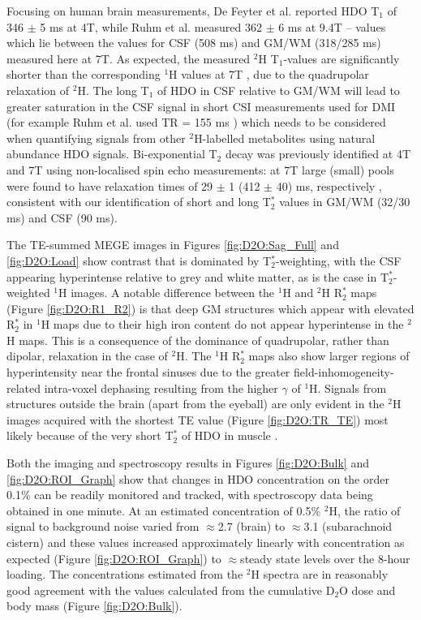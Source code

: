 \documentclass[class=article, crop=false]{standalone}
\begin{document}
Focusing on human brain measurements, De Feyter et al. \cite{DeFeyter2018DeuteriumVivo} reported HDO T$_1$ of 346 $\pm$ 5 ms at 4T, while Ruhm et al. \cite{Ruhm2021DeuteriumResolution} measured 362 $\pm$ 6 ms at 9.4T – values which lie between the values for CSF (508 ms) and GM/WM (318/285 ms) measured here at 7T. As expected, the measured $^2$H T$_1$-values are significantly shorter than the corresponding $^1$H values at 7T \cite{Peters2007T27T}, due to the quadrupolar relaxation of $^2$H. The long T$_1$ of HDO in CSF relative to GM/WM will lead to greater saturation in the CSF signal in short CSI measurements used for DMI (for example Ruhm et al. used TR = 155 ms \cite{Ruhm2021DeuteriumResolution}) which needs to be considered when quantifying signals from other $^2$H-labelled metabolites using natural abundance HDO signals. Bi-exponential T$_2$ decay was previously identified at 4T \cite{DeFeyter2018DeuteriumVivo} and 7T \cite{Roig2022Deuterium7T} using non-localised spin echo measurements: at 7T  large (small) pools were found to have relaxation times of 29 $\pm$ 1 (412 $\pm$ 40) ms, respectively \cite{Roig2022Deuterium7T}, consistent with our identification of short and long T$_2^*$ values in GM/WM (32/30 ms) and CSF (90 ms). 

The TE-summed MEGE images in Figures \ref{fig:D2O:Sag_Full} and \ref{fig:D2O:Load} show contrast that is dominated by T$_2^*$-weighting, with the CSF appearing hyperintense relative to grey and white matter, as is the case in T$_2^*$-weighted $^1$H images. A notable difference between the $^1$H and $^2$H R$_2^*$ maps (Figure \ref{fig:D2O:R1_R2}) is that deep GM structures which appear with elevated R$_2^*$ in $^1$H maps due to their high iron content \cite{Peters2007T27T} do not appear hyperintense in the $^2$H maps. This is a consequence of the dominance of quadrupolar, rather than dipolar, relaxation in the case of $^2$H. The $^1$H R$_2^*$ maps also show larger regions of hyperintensity near the frontal sinuses due to the greater field-inhomogeneity-related intra-voxel dephasing resulting from the higher $\gamma$ of $^1$H. Signals from structures outside the brain (apart from the eyeball) are only evident in the $^2$H images acquired with the shortest TE value (Figure \ref{fig:D2O:TR_TE}) most likely because of the very short T$_2^*$ of HDO in muscle \cite{Gursan2022ResidualMuscle,Damion2021NaturalT}.

Both the imaging and spectroscopy results in Figures \ref{fig:D2O:Bulk} and \ref{fig:D2O:ROI_Graph} show that changes in HDO concentration on the order 0.1\% can be readily monitored and tracked, with spectroscopy data being obtained in one minute. At an estimated concentration of 0.5\% $^2$H, the ratio of signal to background noise varied from $\approx$2.7 (brain) to $\approx$3.1 (subarachnoid cistern) and these values increased approximately linearly with concentration as expected (Figure \ref{fig:D2O:ROI_Graph}) to $\approx$steady state levels over the 8-hour loading. The concentrations estimated from the $^2$H spectra are in reasonably good agreement with the values calculated from the cumulative D$_2$O dose and body mass (Figure \ref{fig:D2O:Bulk}). 
\end{document}
